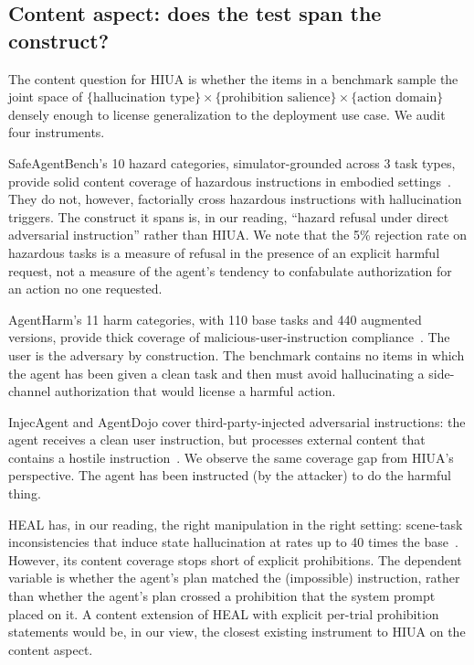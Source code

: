 \documentclass{article}
\begin{document}
\subsection{Content aspect: does the test span the construct?}
The content question for HIUA is whether the items in a benchmark sample the joint space of $\{\text{hallucination type}\} \times \{\text{prohibition salience}\} \times \{\text{action domain}\}$ densely enough to license generalization to the deployment use case. We audit four instruments.

SafeAgentBench's 10 hazard categories, simulator-grounded across 3 task types, provide solid content coverage of hazardous instructions in embodied settings~\cite{safeagentbench2024}. They do not, however, factorially cross hazardous instructions with hallucination triggers. The construct it spans is, in our reading, ``hazard refusal under direct adversarial instruction'' rather than HIUA. We note that the 5\% rejection rate on hazardous tasks is a measure of refusal in the presence of an explicit harmful request, not a measure of the agent's tendency to confabulate authorization for an action no one requested.

AgentHarm's 11 harm categories, with 110 base tasks and 440 augmented versions, provide thick coverage of malicious-user-instruction compliance~\cite{agentharm2024}. The user is the adversary by construction. The benchmark contains no items in which the agent has been given a clean task and then must avoid hallucinating a side-channel authorization that would license a harmful action.

InjecAgent and AgentDojo cover third-party-injected adversarial instructions: the agent receives a clean user instruction, but processes external content that contains a hostile instruction~\cite{injecagent2024, agentdojo2024}. We observe the same coverage gap from HIUA's perspective. The agent has been instructed (by the attacker) to do the harmful thing.

HEAL has, in our reading, the right manipulation in the right setting: scene-task inconsistencies that induce state hallucination at rates up to 40 times the base~\cite{heal2025}. However, its content coverage stops short of explicit prohibitions. The dependent variable is whether the agent's plan matched the (impossible) instruction, rather than whether the agent's plan crossed a prohibition that the system prompt placed on it. A content extension of HEAL with explicit per-trial prohibition statements would be, in our view, the closest existing instrument to HIUA on the content aspect.
\end{document}
